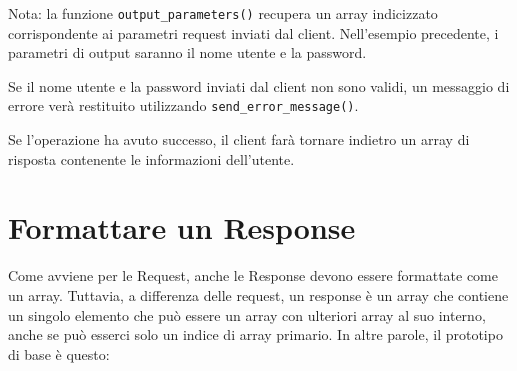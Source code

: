 
Nota: la funzione \verb|output_parameters()| recupera un array indicizzato corrispondente ai parametri request inviati dal client. Nell'esempio precedente, i parametri di output saranno il nome utente e la password.

Se il nome utente e la password inviati dal client non sono validi, un messaggio di errore verà restituito utilizzando \verb|send_error_message()|.

Se l'operazione ha avuto successo, il client farà tornare indietro un array di risposta contenente le informazioni dell'utente.

\section*{Formattare un Response}
Come avviene per le Request, anche le Response devono essere formattate come un array. Tuttavia, a differenza delle request, un response è un array che contiene un singolo elemento che può essere un array con ulteriori array al suo interno, anche se può esserci solo un indice di array primario. In altre parole, il prototipo di base è questo:

